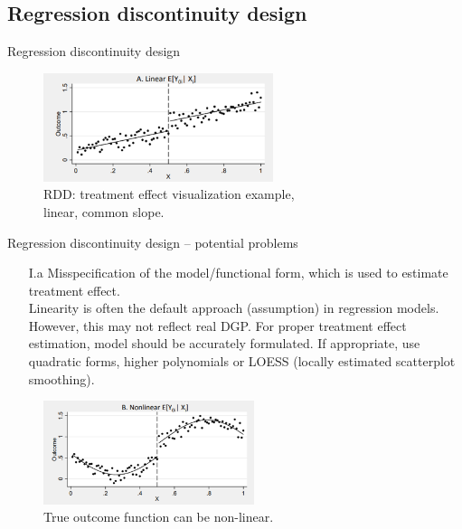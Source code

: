 \documentclass{beamer}
\begin{document}
\subsection{Regression discontinuity design}
\begin{frame}{Regression discontinuity design}
\begin{figure}
    \centering
    \includegraphics[width=0.6\textwidth]{./IMG/RDD1.png} 
    \caption*{RDD: treatment effect visualization example,\\ linear, common slope.}
    \label{fig:my_label}
\end{figure}    
  
    
\end{frame}
\begin{frame}{Regression discontinuity design -- potential problems}
\begin{itemize}
    \item[I.a] Misspecification of the model/functional form, which is used to estimate treatment effect.\\
    \bigskip
    Linearity is often the default approach (assumption) in regression models. However, this may not reflect real DGP. For proper treatment effect estimation, model should be accurately formulated. If appropriate, use quadratic forms, higher polynomials or LOESS (locally estimated scatterplot smoothing).
\end{itemize}
\begin{figure}
    \centering
    \includegraphics[width=0.55\textwidth]{./IMG/RDD2.png} 
    \caption*{True outcome function can be non-linear.} \label{fig:my_label1}
\end{figure}    
\end{frame}
\end{document}
